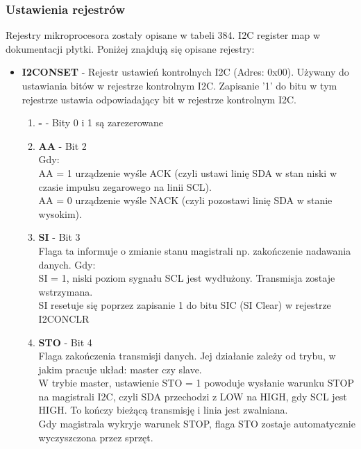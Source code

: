 \documentclass{article}
\begin{document}
\subsubsection{Ustawienia rejestrów}
Rejestry mikroprocesora zostały opisane w tabeli 384. I2C register map w dokumentacji płytki. Poniżej znajdują się opisane rejestry:
\begin{itemize}
    \item \textbf{I2CONSET} - Rejestr ustawień kontrolnych I2C (Adres: 0x00). Używany do ustawiania bitów w rejestrze kontrolnym I2C. Zapisanie '1' do bitu w tym rejestrze ustawia odpowiadający bit w rejestrze kontrolnym I2C.
    \begin{enumerate}
        \item \textbf{-} - Bity 0 i 1 są zarezerowane 
        \item \textbf{AA} - Bit 2 \\
            Gdy:\\
            AA = 1 urządzenie wyśle ACK (czyli ustawi linię SDA w stan niski w czasie impulsu zegarowego na linii SCL). \\
            AA = 0 urządzenie wyśle NACK (czyli pozostawi linię SDA w stanie wysokim).
        \item \textbf{SI} - Bit 3 \\
            Flaga ta informuje o zmianie stanu magistrali np. zakończenie nadawania danych.
            Gdy:\\
            SI = 1, niski poziom sygnału SCL jest wydłużony. Transmisja zostaje wstrzymana.\\
            SI resetuje się poprzez zapisanie 1 do bitu SIC (SI Clear) w rejestrze I2CONCLR
        \item \textbf{STO} - Bit 4\\
            Flaga zakończenia transmisji danych. Jej działanie zależy od trybu, w jakim pracuje układ: master czy slave.\\
            W trybie master, ustawienie STO = 1 powoduje wysłanie warunku STOP na magistrali I2C, czyli SDA przechodzi z LOW na HIGH, gdy SCL jest HIGH. To kończy bieżącą transmisję i linia jest zwalniana.\\
            Gdy magistrala wykryje warunek STOP, flaga STO zostaje automatycznie wyczyszczona przez sprzęt.


\end{enumerate}
\end{itemize}
\end{document}
